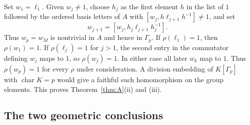 \documentclass[11pt,a4paper]{article}
\numberwithin{equation}{section}
\begin{document}
Set \(w_1=\ell_1\). Given \(w_j\ne1\), choose \(h_j\) as the
first element \(h\) in the list of \(1\) followed by the ordered
basis letters of \(A\) with \([w_j,h\ell_{j+1}h^{-1}]\ne1\), and set
\[
 w_{j+1}=[w_j,h_j\ell_{j+1}h_j^{-1}].
\]
Thus \(w_p=w_M\) is nontrivial in \(A\) and hence in \(\Gamma_p\).
If \(\rho(\ell_1)=1\), then \(\rho(w_1)=1\). If
\(\rho(\ell_j)=1\) for \(j>1\), the second entry in the commutator
defining \(w_j\) maps to \(1\), so \(\rho(w_j)=1\). In either case
all later \(w_k\) map to \(1\). Thus \(\rho(w_p)=1\) for every
\(\rho\) under consideration. A division embedding of
\(K[\Gamma_p]\) with \(\operatorname{char}K=p\) would give a faithful
such homomorphism on the group elements. This proves
Theorem~\ref{thm:A}(ii) and (iii).

\subsection{The two geometric conclusions}
\end{document}
